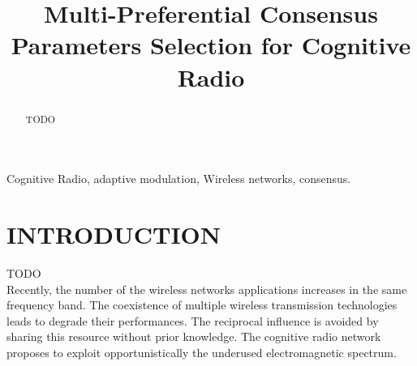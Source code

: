 \documentclass[conference]{IEEEtran}
\begin{document}
%
\title{Multi-Preferential Consensus Parameters Selection for Cognitive Radio}



\author{
}







\maketitle



\begin{abstract}
TODO 
\end{abstract}

\begin{IEEEkeywords}
Cognitive Radio, adaptive modulation, Wireless networks, consensus.
\end{IEEEkeywords}


\section{INTRODUCTION}
TODO\\

Recently, the number of the wireless networks applications increases in the same frequency band. The coexistence of multiple wireless transmission technologies leads to degrade their performances. The reciprocal influence is avoided by sharing this resource without prior knowledge. The cognitive radio network proposes to exploit opportunistically the underused electromagnetic spectrum. 
\end{document}

